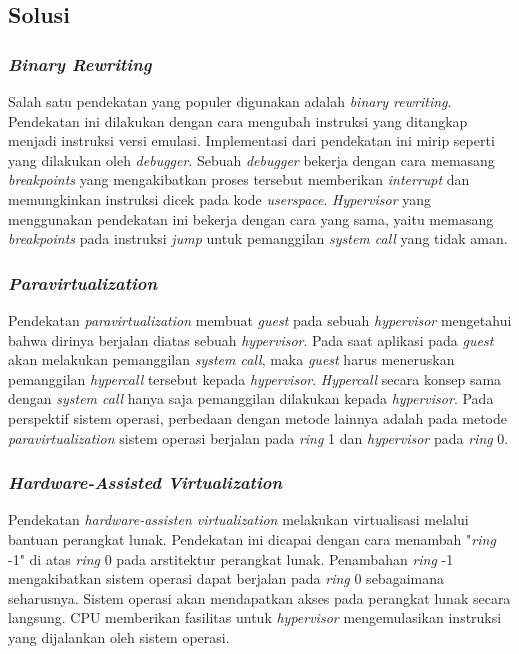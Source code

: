 \subsection{Solusi}

\subsubsection{\textit{Binary Rewriting}}

Salah satu pendekatan yang populer digunakan adalah \textit{binary rewriting}. Pendekatan ini dilakukan dengan cara
mengubah instruksi yang ditangkap menjadi instruksi versi emulasi. Implementasi dari pendekatan ini mirip seperti yang
dilakukan oleh \textit{debugger}. Sebuah \textit{debugger} bekerja dengan cara memasang \textit{breakpoints} yang
mengakibatkan proses tersebut memberikan \textit{interrupt} dan memungkinkan instruksi dicek pada kode
\textit{userspace}. \textit{Hypervisor} yang menggunakan pendekatan ini bekerja dengan cara yang sama, yaitu memasang
\textit{breakpoints} pada instruksi \textit{jump} untuk pemanggilan \textit{system call} yang tidak aman.

\subsubsection{\textit{Paravirtualization}}

Pendekatan \textit{paravirtualization} membuat \textit{guest} pada sebuah \textit{hypervisor} mengetahui bahwa dirinya
berjalan diatas sebuah \textit{hypervisor}. Pada saat aplikasi pada \textit{guest} akan melakukan pemanggilan
\textit{system call}, maka \textit{guest} harus meneruskan pemanggilan \textit{hypercall} tersebut kepada
\textit{hypervisor}. \textit{Hypercall} secara konsep sama dengan \textit{system call} hanya saja pemanggilan dilakukan
kepada \textit{hypervisor}. Pada perspektif sistem operasi, perbedaan dengan metode lainnya adalah pada metode
\textit{paravirtualization} sistem operasi berjalan pada \textit{ring} 1 dan \textit{hypervisor} pada \textit{ring}
0.

\subsubsection{\textit{Hardware-Assisted Virtualization}}

Pendekatan \textit{hardware-assisten virtualization} melakukan virtualisasi melalui bantuan perangkat lunak. Pendekatan
ini dicapai dengan cara menambah "\textit{ring} -1" di atas \textit{ring} 0 pada arstitektur perangkat lunak. Penambahan
\textit{ring} -1 mengakibatkan sistem operasi dapat berjalan pada \textit{ring} 0 sebagaimana seharusnya. Sistem operasi
akan mendapatkan akses pada perangkat lunak secara langsung. CPU memberikan fasilitas untuk \textit{hypervisor}
mengemulasikan instruksi yang dijalankan oleh sistem operasi.
